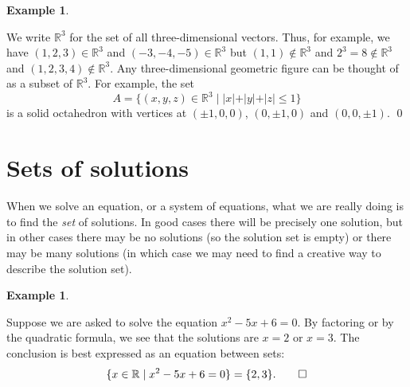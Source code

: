\documentclass[a4paper]{book}
\newcommand{\RED}[1]{{\color{red}#1}}
\newcommand{\R}         {{\mathbb{R}}}
\newcommand{\st}        {\;|\;}
\renewcommand{\:}{\colon}
\newcommand{\bilabel}[1]{\hypertarget{#1}{\label{#1}}}
\newcommand{\EMPH}[1]{\RED{\emph{#1}}}
\theoremstyle{definition}
\newtheorem{example}[theorem]{Example}
\begin{document}
\begin{example}\bilabel{eg-R-three}
 We write $\R^3$ for the set of all three-dimensional vectors.  Thus,
 for example, we have $(1,2,3)\in\R^3$ and $(-3,-4,-5)\in\R^3$ but
 $(1,1)\not\in\R^3$ and $2^3=8\not\in\R^3$ and
 $(1,2,3,4)\not\in\R^3$.  Any three-dimensional geometric figure can
 be thought of as a subset of $\R^3$.  For example, the set
 \[ A = \{(x,y,z)\in\R^3\st |x|+|y|+|z|\leq 1\} \]
 is a solid octahedron with vertices at $(\pm 1,0,0)$, $(0,\pm 1,0)$
 and $(0,0,\pm 1)$. \qed
\end{example}

\section{Sets of solutions}
\label{sec-solution-sets}

When we solve an equation, or a system of equations, what we are
really doing is to find the \EMPH{set} of solutions.  In good cases
there will be precisely one solution, but in other cases there may be
no solutions (so the solution set is empty) or there may be many
solutions (in which case we may need to find a creative way to
describe the solution set).

\begin{example}\bilabel{eg-sols-quadratic}
 Suppose we are asked to solve the equation $x^2-5x+6=0$.  By
 factoring or by the quadratic formula, we see that the solutions are
 $x=2$ or $x=3$.  The conclusion is best expressed as an equation
 between sets:
 \[ \{x\in\R \st x^2-5x+6=0\} = \{2,3\}. \qed\]
\end{example}
\end{document}
